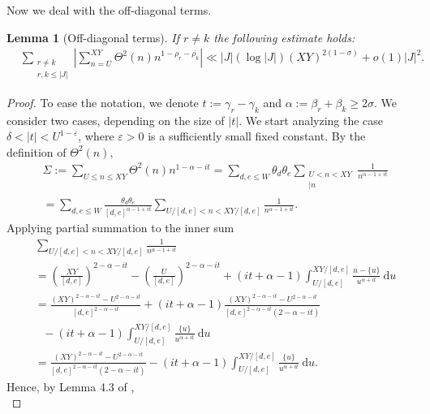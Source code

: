 \documentclass[reqno]{amsart}
\newtheorem{lemma}[theorem]{Lemma}
\numberwithin{equation}{section}
\theoremstyle{remark}
\begin{document}
Now we deal with the off-diagonal terms. 
\begin{lemma}[Off-diagonal terms]\label{lem:offdiagonal}
    If $r\neq k$ the following estimate holds:
    \begin{align*}
        &\sum_{\substack{r\neq k\\r,k\le |J|}}\left|\sum_{n=U}^{XY}\Theta^2(n)n^{1-\rho_r-\overline{\rho_k}}\right|\ll  |J|(\log|J|)(XY)^{2(1-\sigma)}+o(1)|J|^2.
    \end{align*}
\end{lemma}
\begin{proof} To ease the notation, we denote $t:=\gamma_r-\gamma_k$ and $\alpha :=\beta_r+\beta_k\ge 2\sigma$. We consider two cases, depending on the size of $|t|$.
We start analyzing the case $\delta<|t|<U^{1-\varepsilon}$, where $\varepsilon>0 $ is a sufficiently small fixed constant. By the definition of $\Theta^2(n)$,
\begin{align*}
   &\Sigma:=\sum_{U\le n\le XY}\Theta^2(n)n^{1-\alpha-it}=\sum_{d,e\le W}\theta_d\theta_e\sum_{\substack{U<n<XY\\ [d,e]|n}}\frac{1}{n^{\alpha-1+it}}\\&=\sum_{d,e\le W}\frac{\theta_d\theta_e}{[d,e]^{\alpha-1+it}}\sum_{U/[d,e]<n<XY/[d,e]}\frac{1}{n^{\alpha-1+it}}.
\end{align*}
Applying partial summation to the inner sum
\begin{equation*}
\begin{aligned}
&\sum_{U /[d, e]<n<XY /[d, e]} \frac{1}{n^{\alpha-1+i t}}\\&=\left(\frac{ XY}{[d, e]}\right)^{2-\alpha-i t}-\left(\frac{U}{[d, e]}\right)^{2-\alpha-i t}+(i t+\alpha-1) \int_{U /[d, e]}^{ XY /[d, e]} \frac{u-\{u\}}{u^{\alpha+i t}} \mathrm{~d} u \\
& =\frac{(XY)^{2-\alpha-i t}-U^{2-\alpha-i t}}{[d, e]^{2-\alpha-i t}}+(i t+\alpha-1) \frac{(XY)^{2-\alpha-i t}-U^{2-\alpha-i t}}{[d, e]^{2-\alpha-i t}(2-\alpha-i t)}\\ &\ \ \ -(i t+\alpha-1) \int^{XY/[d, e]}_{ U /[d, e]} \frac{\{u\}}{u^{\alpha+i t}} \mathrm{~d} u \\
& =\frac{(XY)^{2-\alpha-i t}-U^{2-\alpha-i t}}{[d, e]^{2-\alpha-i t}(2-\alpha-i t)}-(i t+\alpha-1) \int^{XY/[d, e]}_{ U /[d, e]} \frac{\{u\}}{u^{\alpha+i t}} \mathrm{~d} u .
\end{aligned}
\end{equation*}
Hence, by Lemma 4.3 of \cite{BELLOTTIlogfree},
\begin{equation}\label{constc4}

\end{equation}
\end{proof}
\end{document}
